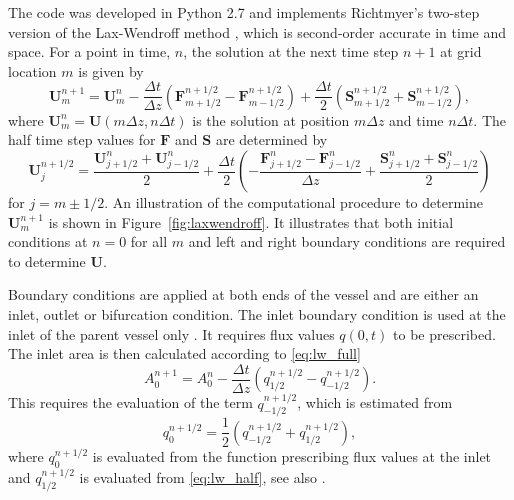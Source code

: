\documentclass{jors}
\begin{document}
The code was developed in Python 2.7 and implements Richtmyer's two-step version of the Lax-Wendroff method \cite{LeVeque1992,Richtmyer1963}, which is second-order accurate in time and space. For a point in time, $n$, the solution at the next time step $n+1$ at grid location $m$ is given by
\begin{equation}\label{eq:lw_full}
  \boldsymbol{U}_m^{n+1} = \boldsymbol{U}_m^n - \frac{\Delta t}{\Delta z} \left( \boldsymbol{F}_{m+1/2}^{n+1/2} - \boldsymbol{F}_{m-1/2}^{n+1/2} \right) + \frac{\Delta t}{2} \left( \boldsymbol{S}_{m+1/2}^{n+1/2} + \boldsymbol{S}_{m-1/2}^{n+1/2} \right),
\end{equation}
where $\boldsymbol{U}_m^n = \boldsymbol{U}(m \Delta z, n \Delta t)$ is the solution at position $m \Delta z$ and time $n \Delta t$. The half time step values for $\boldsymbol{F}$ and $\boldsymbol{S}$ are determined by
\begin{equation}\label{eq:lw_half}
  \boldsymbol{U}_j^{n+1/2} = \frac{\boldsymbol{U}_{j+1/2}^n + \boldsymbol{U}_{j-1/2}^n}{2} + \frac{\Delta t}{2} \left( - \frac{\boldsymbol{F}_{j+1/2}^n - \boldsymbol{F}_{j-1/2}^n}{\Delta z} + \frac{\boldsymbol{S}_{j+1/2}^n + \boldsymbol{S}_{j-1/2}^n}{2} \right)
\end{equation}
for $j = m \pm 1/2$. An illustration of the computational procedure to determine $\boldsymbol{U}_m^{n+1}$ is shown in Figure~\ref{fig:laxwendroff}. It illustrates that both initial conditions at $n = 0$ for all $m$ and left and right boundary conditions are required to determine $\boldsymbol{U}$.

Boundary conditions are applied at both ends of the vessel and are either an inlet, outlet or bifurcation condition. The inlet boundary condition is used at the inlet of the parent vessel only \cite{Olufsen2000}. It requires flux values $q(0,t)$ to be prescribed. The inlet area is then calculated according to \eqref{eq:lw_full}
\begin{equation}
A_0^{n+1} = A_0^n - \frac{\Delta t}{\Delta z} \left( q_{1/2}^{n+1/2} - q_{-1/2}^{n+1/2} \right).
\end{equation}
This requires the evaluation of the term $q_{-1/2}^{n+1/2}$, which is estimated from
\begin{equation}
q_{0}^{n+1/2} = \frac{1}{2} \left( q_{-1/2}^{n+1/2} + q_{1/2}^{n+1/2} \right),
\end{equation}
where $q_{0}^{n+1/2}$ is evaluated from the function prescribing flux values at the inlet and $q_{1/2}^{n+1/2}$ is evaluated from \eqref{eq:lw_half}, see also \cite{Olufsen2000,Kolachalama2007}. 
\end{document}
